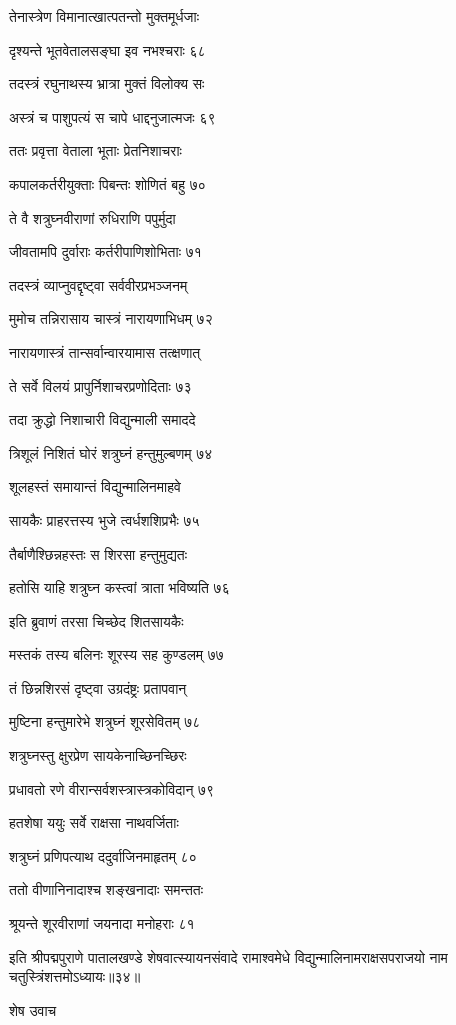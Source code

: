 तेनास्त्रेण विमानात्खात्पतन्तो मुक्तमूर्धजाः

दृश्यन्ते भूतवेतालसङ्घा इव नभश्चराः ६८

तदस्त्रं रघुनाथस्य भ्रात्रा मुक्तं विलोक्य सः

अस्त्रं च पाशुपत्यं स चापे धाद्दनुजात्मजः ६९

ततः प्रवृत्ता वेताला भूताः प्रेतनिशाचराः

कपालकर्तरीयुक्ताः पिबन्तः शोणितं बहु ७०

ते वै शत्रुघ्नवीराणां रुधिराणि पपुर्मुदा

जीवतामपि दुर्वाराः कर्तरीपाणिशोभिताः ७१

तदस्त्रं व्याप्नुवद्दृष्ट्वा सर्ववीरप्रभञ्जनम्

मुमोच तन्निरासाय चास्त्रं नारायणाभिधम् ७२

नारायणास्त्रं तान्सर्वान्वारयामास तत्क्षणात्

ते सर्वे विलयं प्रापुर्निशाचरप्रणोदिताः ७३

तदा क्रुद्धो निशाचारी विद्युन्माली समाददे

त्रिशूलं निशितं घोरं शत्रुघ्नं हन्तुमुल्बणम् ७४

शूलहस्तं समायान्तं विद्युन्मालिनमाहवे

सायकैः प्राहरत्तस्य भुजे त्वर्धशशिप्रभैः ७५

तैर्बाणैश्छिन्नहस्तः स शिरसा हन्तुमुद्यतः

हतोसि याहि शत्रुघ्न कस्त्वां त्राता भविष्यति ७६

इति ब्रुवाणं तरसा चिच्छेद शितसायकैः

मस्तकं तस्य बलिनः शूरस्य सह कुण्डलम् ७७

तं छिन्नशिरसं दृष्ट्वा उग्रदंष्ट्रः प्रतापवान्

मुष्टिना हन्तुमारेभे शत्रुघ्नं शूरसेवितम् ७८

शत्रुघ्नस्तु क्षुरप्रेण सायकेनाच्छिनच्छिरः

प्रधावतो रणे वीरान्सर्वशस्त्रास्त्रकोविदान् ७९

हतशेषा ययुः सर्वे राक्षसा नाथवर्जिताः

शत्रुघ्नं प्रणिपत्याथ ददुर्वाजिनमाहृतम् ८०

ततो वीणानिनादाश्च शङ्खनादाः समन्ततः

श्रूयन्ते शूरवीराणां जयनादा मनोहराः ८१

इति श्रीपद्मपुराणे पातालखण्डे शेषवात्स्यायनसंवादे रामाश्वमेधे विद्युन्मालिनामराक्षसपराजयो नाम चतुस्त्रिंशत्तमोऽध्यायः॥३४॥


शेष उवाच

